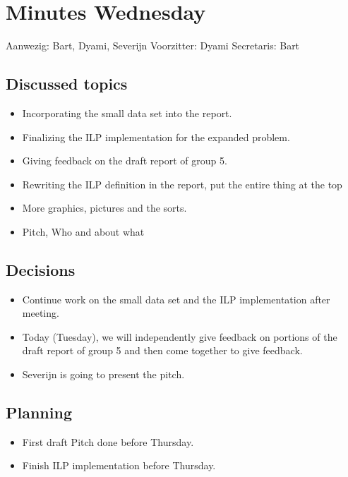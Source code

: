 \documentclass{article}
\begin{document}
\section*{Minutes Wednesday}
Aanwezig: Bart, Dyami, Severijn
Voorzitter: Dyami
Secretaris: Bart

\subsection*{Discussed topics}
\begin{itemize}
    \item Incorporating the small data set into the report.
    \item Finalizing the ILP implementation for the expanded problem.
    \item Giving feedback on the draft report of group 5.
    \item Rewriting the ILP definition in the report, put the entire thing at the top
    \item More graphics, pictures and the sorts.
    \item {Pitch, Who and about what}
\end{itemize}

\subsection*{Decisions}
\begin{itemize}
    \item Continue work on the small data set and the ILP implementation after meeting.
    \item Today (Tuesday), we will independently give feedback on portions of the draft report of group 5 and then come together to give feedback.
    \item Severijn is going to present the pitch.
\end{itemize}

\subsection*{Planning}
\begin{itemize}
    \item First draft Pitch done before Thursday.
    \item Finish ILP implementation before Thursday.
\end{itemize}
\end{document}
